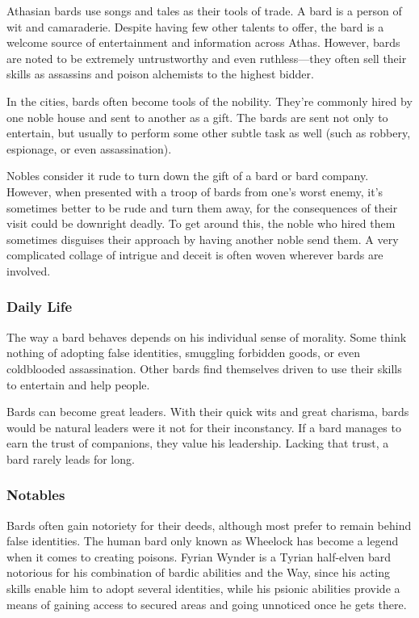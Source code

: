 Athasian bards use songs and tales as their tools of trade. A bard is a person of wit and camaraderie. Despite having few other talents to offer, the bard is a welcome source of entertainment and information across Athas. However, bards are noted to be extremely untrustworthy and even ruthless---they often sell their skills as assassins and poison alchemists to the highest bidder.

In the cities, bards often become tools of the nobility. They're commonly hired by one noble house and sent to another as a gift. The bards are sent not only to entertain, but usually to perform some other subtle task as well (such as robbery, espionage, or even assassination).

Nobles consider it rude to turn down the gift of a bard or bard company. However, when presented with a troop of bards from one's worst enemy, it's sometimes better to be rude and turn them away, for the consequences of their visit could be downright deadly. To get around this, the noble who hired them sometimes disguises their approach by having another noble send them. A very complicated collage of intrigue and deceit is often woven wherever bards are involved.

\subsubsection{Daily Life}
The way a bard behaves depends on his individual sense of morality. Some think nothing of adopting false identities, smuggling forbidden goods, or even coldblooded assassination. Other bards find themselves driven to use their skills to entertain and help people.

Bards can become great leaders. With their quick wits and great charisma, bards would be natural leaders were it not for their inconstancy. If a bard manages to earn the trust of companions, they value his leadership. Lacking that trust, a bard rarely leads for long.

\subsubsection{Notables}
Bards often gain notoriety for their deeds, although most prefer to remain behind false identities. The human bard only known as Wheelock has become a legend when it comes to creating poisons. Fyrian Wynder is a Tyrian half-elven bard notorious for his combination of bardic abilities and the Way, since his acting skills enable him to adopt several identities, while his psionic abilities provide a means of gaining access to secured areas and going unnoticed once he gets there.


